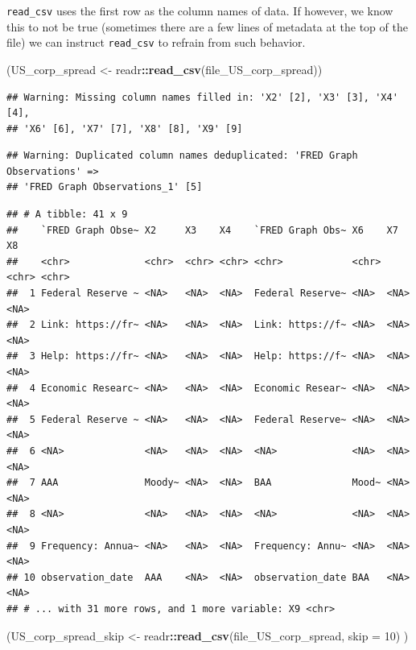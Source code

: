 \documentclass[11pt,]{article}
\newenvironment{Shaded}{\begin{snugshade}}{\end{snugshade}}
\newcommand{\KeywordTok}[1]{\textcolor[rgb]{0.13,0.29,0.53}{\textbf{#1}}}
\newcommand{\DataTypeTok}[1]{\textcolor[rgb]{0.13,0.29,0.53}{#1}}
\newcommand{\DecValTok}[1]{\textcolor[rgb]{0.00,0.00,0.81}{#1}}
\newcommand{\StringTok}[1]{\textcolor[rgb]{0.31,0.60,0.02}{#1}}
\newcommand{\OperatorTok}[1]{\textcolor[rgb]{0.81,0.36,0.00}{\textbf{#1}}}
\newcommand{\NormalTok}[1]{#1}
\begin{document}
\texttt{read\_csv} uses the first row as the column names of data. If
however, we know this to not be true (sometimes there are a few lines of
metadata at the top of the file) we can instruct \texttt{read\_csv} to
refrain from such behavior.

\begin{Shaded}
\begin{Highlighting}[]
\NormalTok{(US_corp_spread <-}\StringTok{ }\NormalTok{readr}\OperatorTok{::}\KeywordTok{read_csv}\NormalTok{(file_US_corp_spread))}
\end{Highlighting}
\end{Shaded}

\begin{verbatim}
## Warning: Missing column names filled in: 'X2' [2], 'X3' [3], 'X4' [4],
## 'X6' [6], 'X7' [7], 'X8' [8], 'X9' [9]
\end{verbatim}

\begin{verbatim}
## Warning: Duplicated column names deduplicated: 'FRED Graph Observations' =>
## 'FRED Graph Observations_1' [5]
\end{verbatim}

\begin{verbatim}
## # A tibble: 41 x 9
##    `FRED Graph Obse~ X2     X3    X4    `FRED Graph Obs~ X6    X7    X8   
##    <chr>             <chr>  <chr> <chr> <chr>            <chr> <chr> <chr>
##  1 Federal Reserve ~ <NA>   <NA>  <NA>  Federal Reserve~ <NA>  <NA>  <NA> 
##  2 Link: https://fr~ <NA>   <NA>  <NA>  Link: https://f~ <NA>  <NA>  <NA> 
##  3 Help: https://fr~ <NA>   <NA>  <NA>  Help: https://f~ <NA>  <NA>  <NA> 
##  4 Economic Researc~ <NA>   <NA>  <NA>  Economic Resear~ <NA>  <NA>  <NA> 
##  5 Federal Reserve ~ <NA>   <NA>  <NA>  Federal Reserve~ <NA>  <NA>  <NA> 
##  6 <NA>              <NA>   <NA>  <NA>  <NA>             <NA>  <NA>  <NA> 
##  7 AAA               Moody~ <NA>  <NA>  BAA              Mood~ <NA>  <NA> 
##  8 <NA>              <NA>   <NA>  <NA>  <NA>             <NA>  <NA>  <NA> 
##  9 Frequency: Annua~ <NA>   <NA>  <NA>  Frequency: Annu~ <NA>  <NA>  <NA> 
## 10 observation_date  AAA    <NA>  <NA>  observation_date BAA   <NA>  <NA> 
## # ... with 31 more rows, and 1 more variable: X9 <chr>
\end{verbatim}

\begin{Shaded}
\begin{Highlighting}[]
\NormalTok{(US_corp_spread_skip <-}\StringTok{ }\NormalTok{readr}\OperatorTok{::}\KeywordTok{read_csv}\NormalTok{(file_US_corp_spread, }
                                        \DataTypeTok{skip =} \DecValTok{10}\NormalTok{)}
\NormalTok{  )}
\end{Highlighting}
\end{Shaded}
\end{document}
